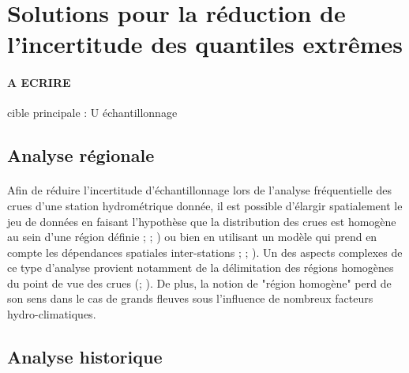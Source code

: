 \documentclass[11pt]{article}
\begin{document}
	
	\section{Solutions pour la réduction de l'incertitude des quantiles extrêmes}
	
	\paragraph{A ECRIRE} cible principale : U échantillonnage
	
	\subsection{Analyse régionale}
	
	\paragraph{} Afin de réduire l'incertitude d'échantillonnage lors de l'analyse fréquentielle des crues d'une station hydrométrique donnée, il est possible d'élargir spatialement le jeu de données en faisant l'hypothèse que la distribution des crues est homogène au sein d'une région définie \citet{hosking_regional_1997}; \citet{gaume_bayesian_2010}; \citet{viglione_flood_2013}) ou bien en utilisant un modèle qui prend en compte les dépendances spatiales inter-stations \citet{kjeldsen_exploratory_2009}; \citet{renard_bayesian_2011}; \citet{sun_general_2014}). Un des aspects complexes de ce type d'analyse provient notamment de la délimitation des régions homogènes du point de vue des crues (\citet{ouarda_regional_2001}; \citet{han_network_2020}). De plus, la notion de "région homogène" perd de son sens dans le cas de grands fleuves sous l'influence de nombreux facteurs hydro-climatiques.  
	
	\subsection{Analyse historique}
	
\end{document}

